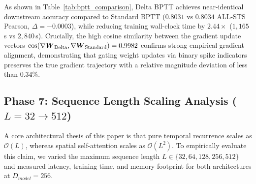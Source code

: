 \documentclass[10pt,a4paper,twoside]{article}
\begin{document}
As shown in Table~\ref{tab:bptt_comparison}, Delta BPTT achieves near-identical downstream accuracy compared to Standard BPTT ($0.8031$ vs $0.8034$ ALL-STS Pearson, $\Delta = -0.0003$), while reducing training wall-clock time by $2.44\times$ ($1{,}165$\,s vs $2{,}840$\,s). Crucially, the high cosine similarity between the gradient update vectors $\cos(\nabla \boldsymbol{W}_{\text{Delta}}, \nabla \boldsymbol{W}_{\text{Standard}}) = 0.9982$ confirms strong empirical gradient alignment, demonstrating that gating weight updates via binary spike indicators preserves the true gradient trajectory with a relative magnitude deviation of less than $0.34\%$.

\subsection{Phase 7: Sequence Length Scaling Analysis \texorpdfstring{($L=32 \to 512$)}{L=32 to 512}}
A core architectural thesis of this paper is that pure temporal recurrence scales as $\mathcal{O}(L)$, whereas spatial self-attention scales as $\mathcal{O}(L^2)$. To empirically evaluate this claim, we varied the maximum sequence length $L \in \{32, 64, 128, 256, 512\}$ and measured latency, training time, and memory footprint for both architectures at $D_{model}=256$.
\end{document}
